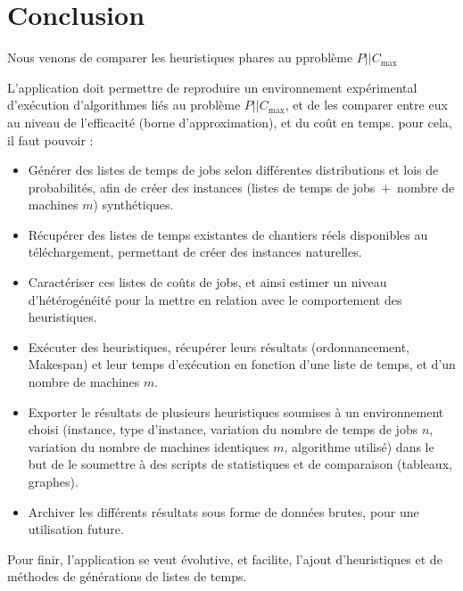 \documentclass[a4paper,12pt]{report}
\theoremstyle{plain}				%
\theoremstyle{definition}				%
\newcommand\problemGrahamP{$P||C_{\max}$\xspace}
\begin{document}
\section{Conclusion} \label{sec:conclusion}

Nous venons de comparer les heuristiques phares au pproblème \problemGrahamP  



\begin{appendices}



L'application doit permettre de reproduire un environnement expérimental d'exécution d'algorithmes liés au problème \problemGrahamP, et de les comparer entre eux au niveau de l'efficacité (borne d'approximation), et du coût en temps.
pour cela, il faut pouvoir :
\begin{itemize}
\item Générer des listes de temps de jobs selon différentes distributions et lois de probabilités, 
  afin de créer des instances (listes de temps de jobs~$+$~nombre de machines $m$) synthétiques. 
\item Récupérer des listes de temps existantes de chantiers réels disponibles au téléchargement, 
  permettant de créer des instances naturelles.
\item Caractériser ces listes de coûts de jobs, et ainsi estimer un niveau d’hétérogénéité 
  pour la mettre en relation avec le comportement des heuristiques.
\item Exécuter des heuristiques, récupérer leurs résultats (ordonnancement, Makespan) 
  et leur temps d’exécution 
  en fonction d'une liste de temps, et d'un nombre de machines $m$.
\item Exporter le résultats de plusieurs heuristiques soumises à 
  un environnement choisi 
  (instance, type  d'instance, variation du nombre de temps de jobs $n$, 
  variation du nombre de machines identiques $m$, algorithme utilisé) 
  dans le but de le soumettre à des scripts de statistiques et de comparaison (tableaux, graphes).
\item Archiver les différents résultats sous forme de données brutes, pour une utilisation future. 
\end{itemize} 
Pour finir, l'application se veut évolutive, et facilite, l'ajout d'heuristiques et de méthodes de générations de listes de temps.


\end{appendices}
\end{document}
